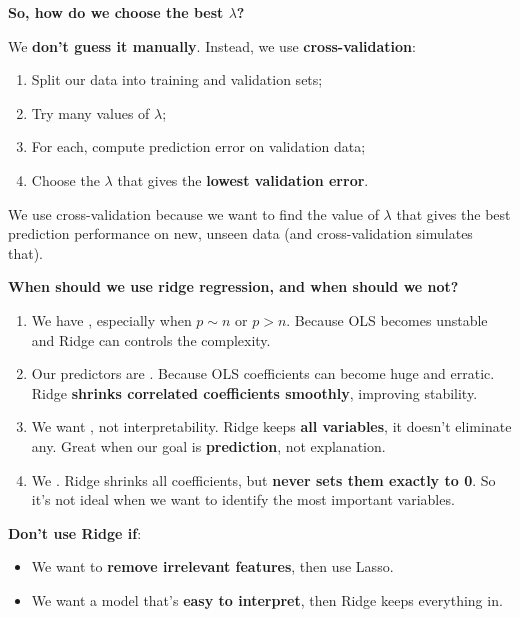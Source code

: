 \begin{flushleft}
    \textcolor{Green3}{ \textbf{So, how do we choose the best $\lambda$?}}
\end{flushleft}
We \textbf{don't guess it manually}. Instead, we use \textbf{cross-validation}:
\begin{enumerate}
    \item Split our data into training and validation sets;
    \item Try many values of $\lambda$;
    \item For each, compute prediction error on validation data;
    \item Choose the $\lambda$ that gives the \textbf{lowest validation error}.
\end{enumerate}
We use cross-validation because we want to find the value of $\lambda$ that gives the best prediction performance on new, unseen data (and cross-validation simulates that).

\highspace
\begin{flushleft}
    \textcolor{Green3}{ \textbf{When should we use ridge regression, and when should we not?}}
\end{flushleft}
\begin{enumerate}
    \item We have , especially when $p \sim n$ or $p > n$. Because OLS becomes unstable and Ridge can controls the complexity.
    \item Our predictors are . Because OLS coefficients can become huge and erratic. Ridge \textbf{shrinks correlated coefficients smoothly}, improving stability.
    \item We want , not interpretability. Ridge keeps \textbf{all variables}, it doesn't eliminate any. Great when our goal is \textbf{prediction}, not explanation.
    \item We . Ridge shrinks all coefficients, but \textbf{never sets them exactly to 0}. So it's not ideal when we want to identify the most important variables.
\end{enumerate}
\textbf{Don't use Ridge if}:
\begin{itemize}[label=\textcolor{Red2}{}]
    \item We want to \textbf{remove irrelevant features}, then use Lasso.
    \item We want a model that's \textbf{easy to interpret}, then Ridge keeps everything in.
\end{itemize}